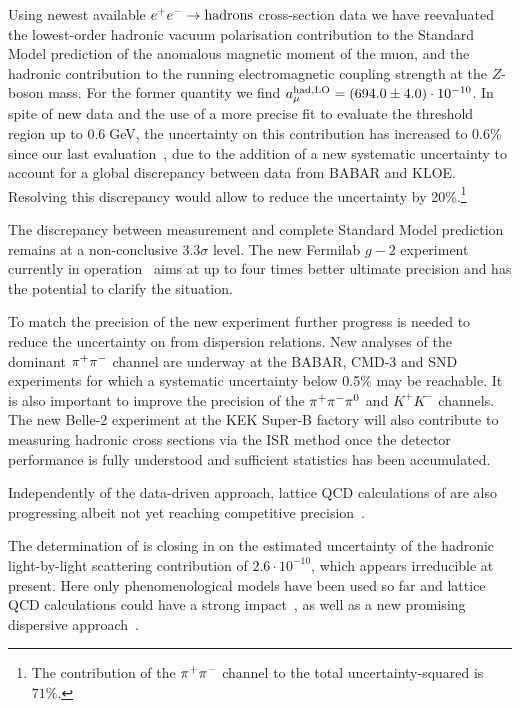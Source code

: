 Using newest available $e^+e^-\to {\rm hadrons}$ cross-section data we have reevaluated the lowest-order hadronic vacuum polarisation contribution to the Standard Model prediction of the anomalous magnetic moment of the muon, and the hadronic contribution to the running electromagnetic coupling strength at the $Z$-boson mass. For the former quantity we find $a_\mu^{\rm had,LO} = (694.0 \pm 4.0)\cdot 10^{-10}$. In spite of new data and the use of a more precise fit to evaluate the threshold region up to 0.6$\;$GeV, the uncertainty on this contribution has increased to 0.6\% since our last evaluation~\cite{dhmz2017}, due to the addition of a new systematic uncertainty to account for a global discrepancy between \pp data from BABAR and KLOE.
Resolving this discrepancy would allow to reduce the \amuhadLO uncertainty by 20\%.\footnote{The contribution of the $\pi^+\pi^-$ channel to the total \amuhadLO uncertainty-squared is $71\%$.} 

\sloppy
The discrepancy between measurement and complete Standard Model prediction remains at a non-conclusive $3.3\sigma$ level. The new Fermilab $g-2$ experiment currently in operation~\cite{fnal-g-2} aims at up to four times better ultimate precision and has the potential to clarify the situation. 

To match the precision of the new experiment  further progress is  needed to reduce the uncertainty on \amuhadLO from dispersion relations. New analyses of the dominant $\pi^+\pi^-$ channel are underway at the BABAR, CMD-3 and SND experiments for which a systematic uncertainty below 0.5\% may be reachable.  It is also important to  improve the precision of the $\pi^+\pi^-\pi^0$ and $K^+ K^-$ channels. The new Belle-2 experiment at the KEK Super-B factory will also contribute to measuring hadronic cross sections via the ISR method once the detector performance is fully understood and sufficient statistics has been accumulated. 

Independently of the data-driven approach, lattice QCD calculations of \amuhadLO  are  also progressing albeit not yet reaching competitive  precision~\cite{Lattice-amu}.

The determination of \amuhadLO is closing in on the estimated  uncertainty of the hadronic light-by-light scattering contribution \amuhadLBL of  $2.6\cdot10^{-10}$, which appears irreducible at present. Here only phenomenological models have been used so far and lattice QCD calculations could have a strong impact~\cite{Lattice-lbl}, as well as a new promising dispersive approach~\cite{Hoferichter:2018kwz}. 
